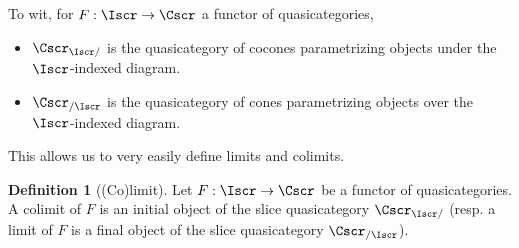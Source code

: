 \documentclass{amsart}
\theoremstyle{definition}
\newtheorem{definition}[theorem]{Definition}
\numberwithin{equation}{section}
\begin{document}
To wit, for $F:\Iscr\to\Cscr$ a functor of quasicategories,
\begin{itemize}
  \item $\Cscr_{\Iscr/}$ is the quasicategory of cocones parametrizing objects under the $\Iscr$-indexed diagram.
  \item $\Cscr_{/\Iscr}$ is the quasicategory of cones parametrizing objects over the $\Iscr$-indexed diagram.
\end{itemize}
This allows us to very easily define limits and colimits.
\begin{definition}[(Co)limit]\label{def: colimits II}
  Let $F:\Iscr\to\Cscr$ be a functor of quasicategories. A colimit of $F$ is an initial object of the slice quasicategory $\Cscr_{\Iscr/}$ (resp. a limit of $F$ is a final object of the slice quasicategory $\Cscr_{/\Iscr}$).
\end{definition}
\newpage
\printbibliography
\end{document}
